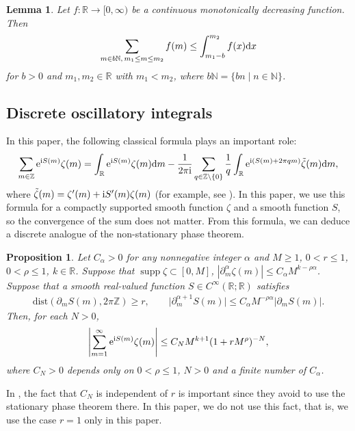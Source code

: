 \documentclass[pdftex]{sigma}
\numberwithin{equation}{section}
\newtheorem{Lemma}[Theorem]{Lemma}
\newtheorem{Proposition}[Theorem]{Proposition}
 { \theoremstyle{definition}
\newtheorem{Definition}[Theorem]{Definition}
\newtheorem{Note}[Theorem]{Note}
\newtheorem{Example}[Theorem]{Example}
\newtheorem{Remark}[Theorem]{Remark} }
\def\R{\mathbb{R}}%
\DeclareMathOperator{\supp}{supp}%
\def\a{\alpha}
\def\z{\zeta}
\def\pa{\partial}
\begin{document}
\begin{Lemma}\label{monotonesum}
Let $f\colon\R\to [0,\infty)$ be a continuous monotonically decreasing function. Then
\begin{align*}
\sum_{m\in b\mathbb{N},\, m_1\leq m\leq m_2}f(m)\leq \int_{m_1-b}^{m_2}f(x){\rm d}x
\end{align*}
for $b>0$ and $m_1,m_2\in \mathbb{R}$ with $m_1<m_2$, where $b\mathbb{N}=\{b n\mid n\in \mathbb{N}\}$.
\end{Lemma}

\subsection{Discrete oscillatory integrals}

In this paper, the following classical formula plays an important role:
\begin{align}\label{discon}
\sum_{m\in\mathbb{Z}}{\rm e}^{{\rm i}S(m)}\z(m)=\int_{\R}{\rm e}^{{\rm i}S(m)}\z(m){\rm d}m-\frac{1}{2\pi {\rm i}}\sum_{q\in\mathbb{Z}\setminus \{0\}}\frac{1}{q}\int_{\R}{\rm e}^{{\rm i}(S(m)+2\pi qm)}\tilde{\z}(m) {\rm d}m,
\end{align}
where $\tilde{\z}(m)=\z'(m)+{\rm i}S'(m)\z(m)$ (for example, see \cite[Proof of Lemma 5.3]{IJ}). In this paper, we use this formula for a compactly supported smooth function $\z$ and a smooth function $S$, so the convergence of the sum does not matter.
 From this formula, we can deduce a discrete analogue of the non-stationary phase theorem.

\begin{Proposition}\label{discsum1}
Let $C_{\a}>0$ for any nonnegative integer $\a$ and $M\geq 1$, $0<r\leq 1$, $0<\rho\leq 1$, $k\in \R$.
Suppose that
$
\supp \z\subset [0,M]$, $ |\pa_m^{\a}\z(m)|\leq C_{\a}M^{k-\rho\a}$.
Suppose that a smooth real-valued function $S\in C^{\infty}(\R;\R)$ satisfies
\begin{align*}
\mathrm{dist}(\pa_mS(m), 2\pi\mathbb{Z})\geq r,\qquad \big|\pa_m^{\a+1}S(m)\big|\leq C_{\a}M^{-\rho\a}|\pa_mS(m)|.
\end{align*}
Then, for each $N>0$,
\begin{align*}
\left|\sum_{m=1}^{\infty}{\rm e}^{{\rm i}S(m)}\z(m)\right|\leq C_NM^{k+1}(1+r M^{\rho})^{-N},
\end{align*}
where $C_N>0$ depends only on $0<\rho\leq 1$, $N>0$ and a finite number of $C_{\a}$.
\end{Proposition}

\begin{Remark}
In \cite{IJ}, the fact that $C_N$ is independent of $r$ is important since they avoid to use the stationary phase theorem there. In this paper, we do not use this fact, that is, we use the case $r=1$ only in this paper.
\end{Remark}
\end{document}
